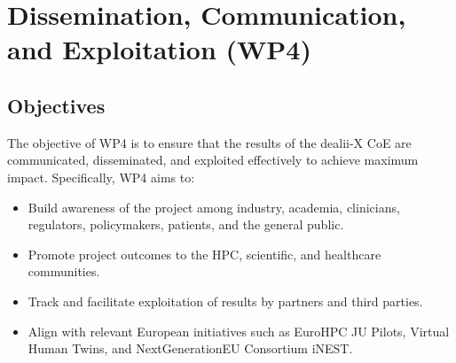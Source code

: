 \documentclass[a4paper,12pt, numbers]{article}
\begin{document}


\newpage

\section{{Dissemination, Communication, and Exploitation (WP4)}}
\label{sec:wp4_communication}

\subsection{Objectives}

The objective of WP4 is to ensure that the results of the dealii-X CoE are communicated, disseminated, and exploited effectively to achieve maximum impact. Specifically, WP4 aims to:
\begin{itemize}[left=1em, itemsep=0pt, topsep=0pt] 
\item Build awareness of the project among industry, academia, clinicians, regulators, policymakers, patients, and the general public.
\item Promote project outcomes to the HPC, scientific, and healthcare communities.
\item Track and facilitate exploitation of results by partners and third parties.
\item Align with relevant European initiatives such as EuroHPC JU Pilots, Virtual Human Twins, and NextGenerationEU Consortium iNEST.
\end{itemize}
\end{document}
